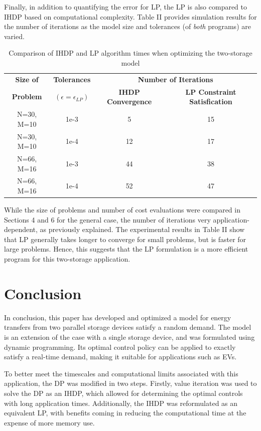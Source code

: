 \documentclass[conference]{IEEEtran}
\begin{document}
Finally, in addition to quantifying the error for LP, the LP is also compared to IHDP based on computational complexity. Table II provides simulation results for the number of iterations as the model size and tolerances (of \textit{both} programs) are varied.

\begin{table}[htbp]
	\begin{center}
		\begin{tabular}{|c|c|c|c|}
			\hline
			\textbf{Size of}&\textbf{Tolerances}&\multicolumn{2}{|c|}{\textbf{Number of Iterations}} \\
			\cline{3-4} 
			\textbf{Problem} & \textbf{$(\epsilon=\epsilon_{LP})$} & \textbf{IHDP Convergence} &  \textbf{LP Constraint Satisfication} \\
			\hline
			N=30, M=10& 1e-3 & 5 & 15 \\
			\hline
			N=30, M=10& 1e-4 & 12 & 17 \\
			\hline
			N=66, M=16& 1e-3 & 44 & 38 \\
			\hline
			N=66, M=16& 1e-4 & 52 & 47 \\
			\hline
		\end{tabular}
	\end{center}
	\label{tab:Table2}
	\caption{Comparison of IHDP and LP algorithm times when optimizing the two-storage model}
\end{table}While the size of problems and number of cost evaluations were compared in Sections 4 and 6 for the general case, the number of iterations very application-dependent, as previously explained. The experimental results in Table II show that LP generally takes longer to converge for small problems, but is faster for large problems. Hence, this suggests that the LP formulation is a more efficient program for this two-storage application.

\section{Conclusion}
In conclusion, this paper has developed and optimized a model for energy transfers from two parallel storage devices satisfy a random demand. The model is an extension of the case with a single storage device, and was formulated using dynamic programming. Its optimal control policy can be applied to exactly satisfy a real-time demand, making it suitable for applications such as EVs.

To better meet the timescales and computational limits associated with this application, the DP was modified in two steps. Firstly, value iteration was used to solve the DP as an IHDP, which allowed for determining the optimal controls with long application times. Additionally, the IHDP was reformulated as an equivalent LP, with benefits coming in reducing the computational time at the expense of more memory use.
\end{document}
